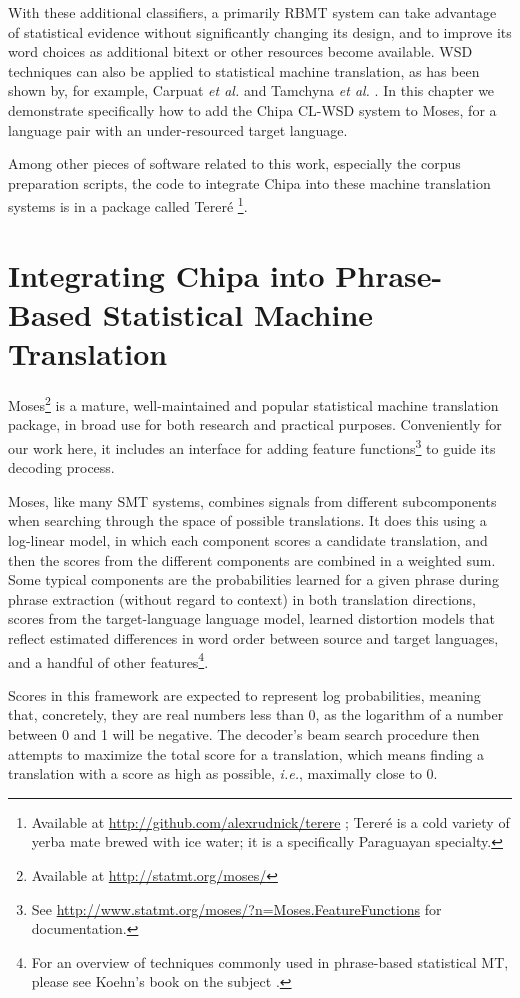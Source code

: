 With these additional classifiers, a primarily RBMT system can take advantage
of statistical evidence without significantly changing its design, and to
improve its word choices as additional bitext or other resources become
available.
WSD techniques can also be applied to statistical machine translation, as has
been shown by, for example, Carpuat \emph{et al.} \cite{carpuatpsd} and Tamchyna
\emph{et al.} \cite{tamchyna2014integrating}. In this chapter we demonstrate
specifically how to add the Chipa CL-WSD system to Moses, for a language pair
with an under-resourced target language.

Among other pieces of software related to this work, especially the corpus
preparation scripts, the code to integrate Chipa into these machine
translation systems is in a package called Tereré \footnote{Available at
\url{http://github.com/alexrudnick/terere} ; Tereré is a cold variety of yerba
mate brewed with ice water; it is a specifically Paraguayan specialty.}.


\section{Integrating Chipa into Phrase-Based Statistical Machine Translation}
Moses\footnote{Available at
\url{http://statmt.org/moses/}} is a mature,
well-maintained and popular statistical machine translation package, in broad
use for both research and practical purposes. Conveniently for our work here,
it includes an interface for adding feature functions\footnote{See
\url{http://www.statmt.org/moses/?n=Moses.FeatureFunctions} for documentation.}
to guide its decoding process.

Moses, like many SMT systems, combines signals from different subcomponents
when searching through the space of possible translations. It does this using a
log-linear model, in which each component scores a candidate translation, and
then the scores from the different components are combined in a weighted sum.
Some typical components are the probabilities learned for a given phrase during
phrase extraction (without regard to context) in both translation directions,
scores from the target-language language model, learned distortion models that
reflect estimated differences in word order between source and target
languages, and a handful of other features\footnote{For an overview of
techniques commonly used in phrase-based statistical MT, please see Koehn's
book on the subject \cite{koehn2010statistical}.}.

Scores in this framework are expected to represent log probabilities, meaning
that, concretely, they are real numbers less than 0, as the logarithm of a
number between 0 and 1 will be negative. The decoder's beam search procedure
then attempts to maximize the total score for a translation, which means finding
a translation with a score as high as possible, \emph{i.e.}, maximally close to
0.

